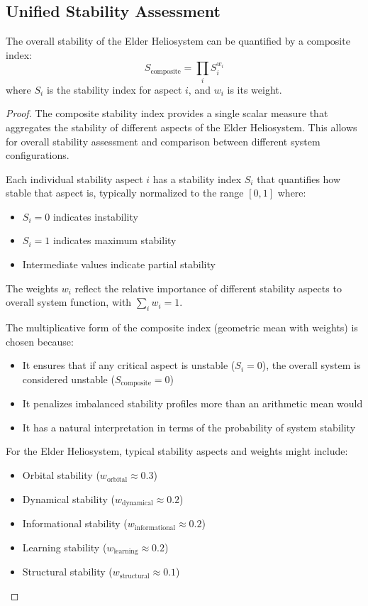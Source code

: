 \subsection{Unified Stability Assessment}

\begin{theorem}
The overall stability of the Elder Heliosystem can be quantified by a composite index:
\begin{equation}
S_{\text{composite}} = \prod_i S_i^{w_i}
\end{equation}
where $S_i$ is the stability index for aspect $i$, and $w_i$ is its weight.
\end{theorem}

\begin{proof}
The composite stability index provides a single scalar measure that aggregates the stability of different aspects of the Elder Heliosystem. This allows for overall stability assessment and comparison between different system configurations.

Each individual stability aspect $i$ has a stability index $S_i$ that quantifies how stable that aspect is, typically normalized to the range $[0, 1]$ where:
\begin{itemize}
    \item $S_i = 0$ indicates instability
    \item $S_i = 1$ indicates maximum stability
    \item Intermediate values indicate partial stability
\end{itemize}

The weights $w_i$ reflect the relative importance of different stability aspects to overall system function, with $\sum_i w_i = 1$.

The multiplicative form of the composite index (geometric mean with weights) is chosen because:
\begin{itemize}
    \item It ensures that if any critical aspect is unstable ($S_i = 0$), the overall system is considered unstable ($S_{\text{composite}} = 0$)
    \item It penalizes imbalanced stability profiles more than an arithmetic mean would
    \item It has a natural interpretation in terms of the probability of system stability
\end{itemize}

For the Elder Heliosystem, typical stability aspects and weights might include:
\begin{itemize}
    \item Orbital stability ($w_{\text{orbital}} \approx 0.3$)
    \item Dynamical stability ($w_{\text{dynamical}} \approx 0.2$)
    \item Informational stability ($w_{\text{informational}} \approx 0.2$)
    \item Learning stability ($w_{\text{learning}} \approx 0.2$)
    \item Structural stability ($w_{\text{structural}} \approx 0.1$)
\end{itemize}


\end{proof}
